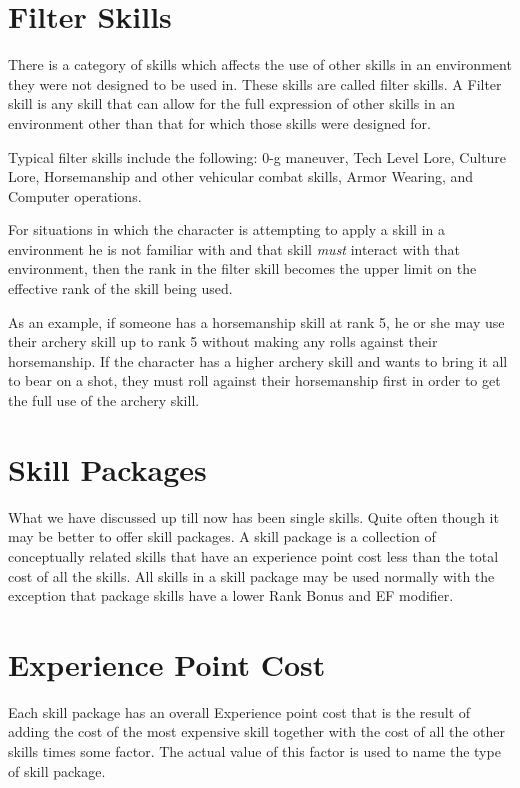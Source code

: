 \section{Filter Skills}

There is a category of skills which affects the use of other skills
in an environment they were not designed to be used in. These skills
are called filter skills. A Filter skill is any skill that can allow
for the full expression of other skills in an environment other than
that for which those skills were designed for.

Typical filter skills include the following: 0-g maneuver, Tech
Level Lore, Culture Lore, Horsemanship and other vehicular combat
skills, Armor Wearing, and Computer operations.

For situations in which the character is attempting to apply a skill
in a environment he is not familiar with and that skill {\em must }
interact with that environment, then the rank in the filter skill
becomes the upper limit on the effective rank of the skill being
used.

As an example, if someone has a horsemanship skill at rank 5, he or she
may use their archery skill up to rank 5 without making any rolls
against their horsemanship. If the character has a higher archery skill
and wants to bring it all to bear on a shot, they must roll against
their horsemanship first in order to get the full use of the archery
skill.

\section{Skill Packages}

What we have discussed up till now has been single skills.
Quite often though it may be better to offer skill packages.
A skill package is a collection of conceptually related
skills that have an experience point cost less than the total
cost of all the skills. All skills in a skill package may be
used normally with the exception that package skills have a lower
Rank Bonus and EF modifier.

\section{Experience Point Cost}

Each skill package has an overall Experience point cost that is
the result of adding the cost of the most expensive skill together
with the cost of all the other skills times some factor. The actual value
of this factor is used to name the type of skill package.

